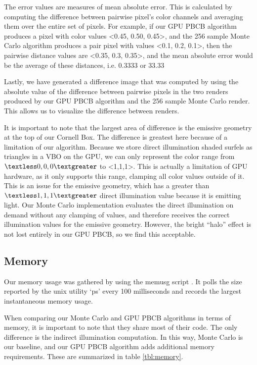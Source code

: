 The error values are measures of mean absolute error. This is calculated by computing the difference between pairwise pixel’s color channels and averaging them over the entire set of pixels. For example, if our GPU PBCB algorithm produces a pixel with color values \textless0.45, 0.50, 0.45\textgreater, and the 256 sample Monte Carlo algorithm produces a pair pixel with values \textless0.1, 0.2, 0.1\textgreater, then the pairwise distance values are \textless0.35, 0.3, 0.35\textgreater, and the mean absolute error would be the average of these distances, i.e. 0.3333 or 33.33%

Lastly, we have generated a difference image that was computed by using the absolute value of the difference between pairwise pixels in the two renders produced by our GPU PBCB algorithm and the 256 sample Monte Carlo render. This allows us to visualize the difference between renders.

It is important to note that the largest area of difference is the emissive geometry at the top of our Cornell Box. The difference is greatest here because of a limitation of our algorithm. Because we store direct illumination shaded surfels as triangles in a VBO on the GPU, we can only represent the color range from $\textless0,0,0\textgreater$ to \textless1,1,1\textgreater. This is actually a limitation of GPU hardware, as it only supports this range, clamping all color values outside of it. This is an issue for the emissive geometry, which has a greater than $\textless1,1,1\textgreater$ direct illumination value because it is emitting light. Our Monte Carlo implementation evaluates the direct illumination on demand without any clamping of values, and therefore receives the correct illumination values for the emissive geometry. However, the bright “halo” effect is not lost entirely in our GPU PBCB, so we find this acceptable.

\subsection{Memory}
Our memory usage was gathered by using the memusg script \cite{bib:memusg}. It polls the size reported by the unix utility ‘ps’ every 100 milliseconds and records the largest instantaneous memory usage.

When comparing our Monte Carlo and GPU PBCB algorithms in terms of memory, it is important to note that they share most of their code. The only difference is the indirect illumination computation. In this way, Monte Carlo is our baseline, and our GPU PBCB algorithm adds additional memory requirements. These are summarized in table \ref{tbl:memory}.

